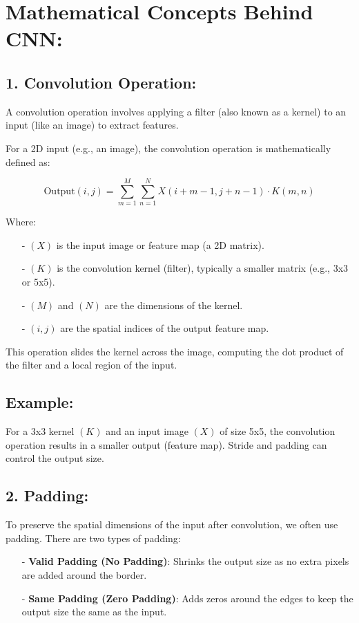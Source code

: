 \documentclass[10pt]{article}
\begin{document}
\section{ Mathematical Concepts Behind CNN:}
\subsection{ 1. {\bf Convolution Operation}:}
A convolution operation involves applying a filter (also known as a kernel) to an input (like an image) to extract features.

For a 2D input (e.g., an image), the convolution operation is mathematically defined as:

$$
\text{Output}(i, j) = \sum_{m=1}^{M} \sum_{n=1}^{N} X(i+m-1, j+n-1) \cdot K(m, n)
$$

Where:
\begin{itemize}
   \item [-] $( X )$ is the input image or feature map (a 2D matrix).
   \item [-] $( K )$ is the convolution kernel (filter), typically a smaller matrix (e.g., 3x3 or 5x5).
   \item [-] $( M )$ and $( N )$ are the dimensions of the kernel.
   \item [-] $( i, j )$ are the spatial indices of the output feature map.
\end{itemize}

This operation slides the kernel across the image, computing the dot product of the filter and a local region of the input.

\subsection{{\bf Example}:}
For a 3x3 kernel $( K )$ and an input image $( X )$ of size 5x5, the convolution operation results in a smaller output (feature map). Stride and padding can control the output size.

\subsection{ 2. {\bf Padding}:}
To preserve the spatial dimensions of the input after convolution, we often use padding. There are two types of padding:

\begin{itemize}
   \item [-] {\bf Valid Padding (No Padding)}: Shrinks the output size as no extra pixels are added around the border.
   \item [-] {\bf Same Padding (Zero Padding)}: Adds zeros around the edges to keep the output size the same as the input.
\end{itemize}
\end{document}
